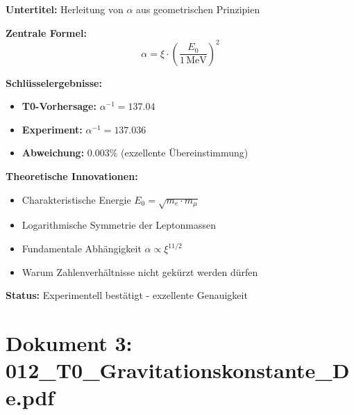 	\begin{documentbox}
		\textbf{Untertitel:} Herleitung von $\alpha$ aus geometrischen Prinzipien
		
		\textbf{Zentrale Formel:}
		\begin{equation}
			\boxed{\alpha = \xi \cdot \left(\frac{E_0}{1\,\text{MeV}}\right)^2}
		\end{equation}
		
		\textbf{Schlüsselergebnisse:}
		\begin{itemize}
			\item \textbf{T0-Vorhersage:} $\alpha^{-1} = 137.04$
			\item \textbf{Experiment:} $\alpha^{-1} = 137.036$
			\item \textbf{Abweichung:} 0.003\% (exzellente Übereinstimmung)
		\end{itemize}
		
		\textbf{Theoretische Innovationen:}
		\begin{itemize}
			\item Charakteristische Energie $E_0 = \sqrt{m_e \cdot m_\mu}$
			\item Logarithmische Symmetrie der Leptonmassen
			\item Fundamentale Abhängigkeit $\alpha \propto \xi^{11/2}$
			\item Warum Zahlenverhältnisse nicht gekürzt werden dürfen
		\end{itemize}
		
		\textbf{Status:} Experimentell bestätigt - exzellente Genauigkeit
	\end{documentbox}
	
	\section{Dokument 3: 012\_T0\_Gravitationskonstante\_De.pdf}
	
